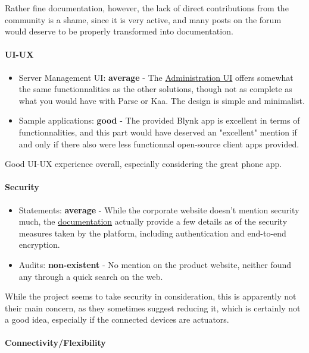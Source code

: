 \documentclass{article}
\begin{document}
Rather fine documentation, however, the lack of direct contributions from the community is a shame, since it is very active, and many posts on the forum would deserve to be properly transformed into documentation.

\paragraph{UI-UX}

\begin{itemize}
\item Server Management UI: \textbf{average} - The \href{https://github.com/blynkkk/blynk-server#administration-ui}{Administration UI} offers somewhat the same functionnalities as the other solutions, though not as complete as what you would have with Parse or Kaa. The design is simple and minimalist.
\item Sample applications: \textbf{good} - The provided Blynk app is excellent in terms of functionnalities, and this part would have deserved an "excellent" mention if and only if there also were less functionnal open-source client apps provided. 
\end{itemize}

Good UI-UX experience overall, especially considering the great phone app.

\paragraph{Security} 

\begin{itemize}
\item Statements: \textbf{average} - While the corporate website doesn't mention security much, the \href{http://docs.blynk.cc/#security}{documentation} actually provide a few details as of the security measures taken by the platform, including authentication and end-to-end encryption.
\item Audits: \textbf{non-existent} - No mention on the product website, neither found any through a quick search on the web.
\end{itemize}

While the project seems to take security in consideration, this is apparently not their main concern, as they sometimes suggest reducing it, which is certainly not a good idea, especially if the connected devices are actuators.

\paragraph{Connectivity/Flexibility}
\end{document}
